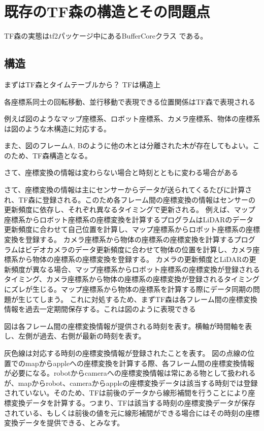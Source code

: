\documentclass[a4paper]{jreport}	%
\begin{document}
\chapter{既存のTF森の構造とその問題点}
TF森の実態はtf2パッケージ中にあるBufferCoreクラス\cite{buffer-core} である。
\section{構造}
まずはTF森とタイムテーブルから？
TFは構造上

各座標系同士の回転移動、並行移動で表現できる位置関係はTF森で表現される

例えば図のようなマップ座標系、ロボット座標系、カメラ座標系、物体の座標系は図のような木構造に対応する。

また、図のフレームA, Bのように他の木とは分離された木が存在してもよい。このため、TF森構造となる。


さて、座標変換の情報は変わらない場合と時刻とともに変わる場合がある

さて、座標変換の情報は主にセンサーからデータが送られてくるたびに計算され、TF森に登録される。このため各フレーム間の座標変換の情報はセンサーの更新頻度に依存し、それぞれ異なるタイミングで更新される。
例えば、マップ座標系からロボット座標系の座標変換を計算するプログラムはLiDARのデータ更新頻度に合わせて自己位置を計算し、マップ座標系からロボット座標系の座標変換を登録する。
カメラ座標系から物体の座標系の座標変換を計算するプログラムはビデオカメラのデータ更新頻度に合わせて物体の位置を計算し、カメラ座標系から物体の座標系の座標変換を登録する。
カメラの更新頻度とLiDARの更新頻度が異なる場合、マップ座標系からロボット座標系の座標変換が登録されるタイミング、カメラ座標系から物体の座標系の座標変換が登録されるタイミングにズレが生じる。マップ座標系から物体の座標系を計算する際にデータ同期の問題が生じてしまう。
これに対処するため、まずTF森は各フレーム間の座標変換情報を過去一定期間保存する。これは図のように表現できる


図は各フレーム間の座標変換情報が提供される時刻を表す。横軸が時間軸を表し、左側が過去、右側が最新の時刻を表す。

灰色線は対応する時刻の座標変換情報が登録されたことを表す。
図の点線の位置でのmapからappleへの座標変換を計算する際、各フレーム間の座標変換情報が必要になる。robotからcameraへの座標変換情報は常にある物として扱われるが、mapからrobot、cameraからappleの座標変換データは該当する時刻では登録されていない。そのため、TFは前後のデータから線形補間を行うことにより座標変換データを計算する。つまり、TFは該当する時刻の座標変換データが保存されている、もしくは前後の値を元に線形補間ができる場合にはその時刻の座標変換データを提供できる、とみなす。
\end{document}
